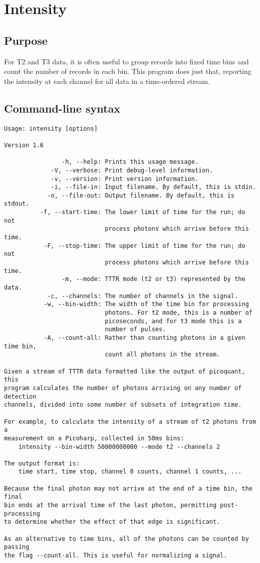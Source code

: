 \section{Intensity}
\subsection{Purpose}
For T2 and T3 data, it is often useful to group records into fixed time bins and count the number of records in each bin. This program does just that, reporting the intensity at each channel for all data in a time-ordered stream. 

\subsection{Command-line syntax}
\begin{verbatim}Usage: intensity [options]

Version 1.6

                -h, --help: Prints this usage message.
             -V, --verbose: Print debug-level information.
             -v, --version: Print version information.
             -i, --file-in: Input filename. By default, this is stdin.
            -o, --file-out: Output filename. By default, this is stdout.
          -f, --start-time: The lower limit of time for the run; do not
                            process photons which arrive before this time.
           -F, --stop-time: The upper limit of time for the run; do not
                            process photons which arrive before this time.
                -m, --mode: TTTR mode (t2 or t3) represented by the data.
            -c, --channels: The number of channels in the signal.
           -w, --bin-width: The width of the time bin for processing 
                            photons. For t2 mode, this is a number of
                            picoseconds, and for t3 mode this is a 
                            number of pulses.
           -A, --count-all: Rather than counting photons in a given time bin,
                            count all photons in the stream.

Given a stream of TTTR data formatted like the output of picoquant, this
program calculates the number of photons arriving on any number of detection
channels, divided into some number of subsets of integration time.

For example, to calculate the intensity of a stream of t2 photons from a
measurement on a Picoharp, collected in 50ms bins:
    intensity --bin-width 50000000000 --mode t2 --channels 2

The output format is:
    time start, time stop, channel 0 counts, channel 1 counts, ...

Because the final photon may not arrive at the end of a time bin, the final
bin ends at the arrival time of the last photon, permitting post-processing
to determine whether the effect of that edge is significant.

As an alternative to time bins, all of the photons can be counted by passing
the flag --count-all. This is useful for normalizing a signal.
\end{verbatim}

